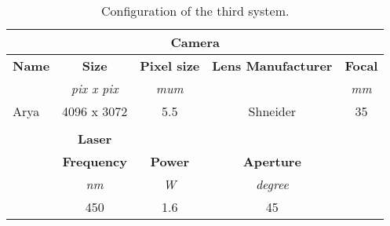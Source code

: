 \begin{table}
  \centering
  \begin{tabular}{ccccc}
  \hline
  \multicolumn{5}{|c|}{\textbf{Camera}}                                                                                                                                                                            \\ \hline
  \multicolumn{1}{|c|}{\textbf{Name}} & \multicolumn{1}{c|}{\textbf{Size}}      & \multicolumn{1}{c|}{\textbf{Pixel size}} & \multicolumn{1}{c|}{\textbf{Lens Manufacturer}} & \multicolumn{1}{c|}{\textbf{Focal}} \\ \hline
  \multicolumn{1}{|l|}{}              & \multicolumn{1}{c|}{\textit{pix x pix}} & \multicolumn{1}{c|}{\textit{mum}}        & \multicolumn{1}{c|}{}                           & \multicolumn{1}{c|}{\textit{mm}}    \\ \hline
  \multicolumn{1}{|l|}{Arya}          & \multicolumn{1}{c|}{4096 x 3072}        & \multicolumn{1}{c|}{5.5}                 & \multicolumn{1}{c|}{Shneider}                   & \multicolumn{1}{c|}{35}             \\ \hline
  \multicolumn{1}{l}{}                & \multicolumn{1}{l}{}                    & \multicolumn{1}{l}{}                     & \multicolumn{1}{l}{}                            & \multicolumn{1}{l}{}                \\ \cline{2-4}
  \multicolumn{1}{c|}{}               & \multicolumn{1}{c|}{\textbf{Laser}}     & \multicolumn{1}{c|}{}                    & \multicolumn{1}{c|}{}                           &                                     \\ \cline{2-4}
  \multicolumn{1}{c|}{}               & \multicolumn{1}{c|}{\textbf{Frequency}} & \multicolumn{1}{c|}{\textbf{Power}}      & \multicolumn{1}{c|}{\textbf{Aperture}}          &                                     \\ \cline{2-4}
  \multicolumn{1}{c|}{\textit{}}      & \multicolumn{1}{c|}{\textit{nm}}        & \multicolumn{1}{c|}{\textit{W}}          & \multicolumn{1}{c|}{\textit{degree}}            & \textit{}                           \\ \cline{2-4}
  \multicolumn{1}{c|}{}               & \multicolumn{1}{c|}{450}                & \multicolumn{1}{c|}{1.6}                 & \multicolumn{1}{c|}{45}                         &                                     \\ \cline{2-4}
  \end{tabular}

  \caption{Configuration of the third system.}
  \label{tab:conf3}
\end{table}